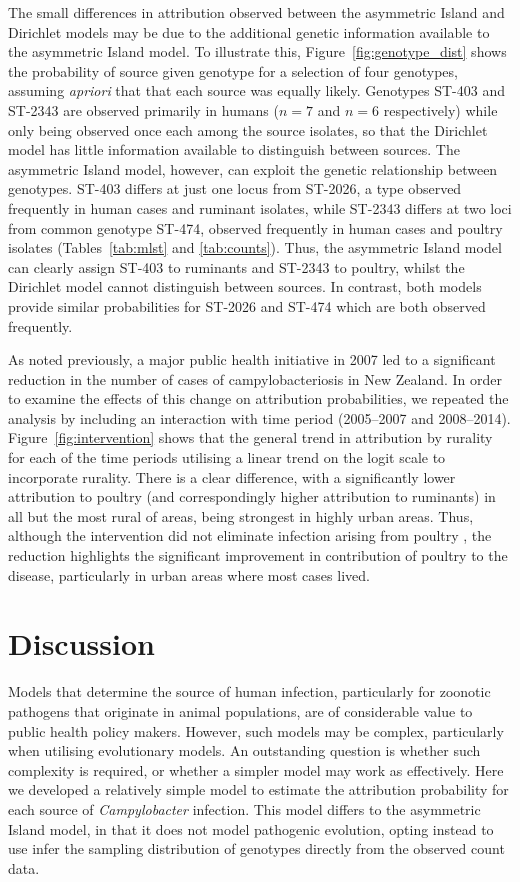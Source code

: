 \documentclass[AMA,STIX1COL]{WileyNJD-v2}
\begin{document}
The small differences in attribution observed between the asymmetric Island and Dirichlet models may be due to the additional genetic information available to the asymmetric Island model. To illustrate this, Figure~\ref{fig:genotype_dist} shows the probability of source given genotype for a selection of four genotypes, assuming \emph{apriori} that that each source was equally likely. Genotypes ST-403 and ST-2343 are observed primarily in humans ($n=7$ and $n=6$ respectively) while only being observed once each among the source isolates, so that the Dirichlet model has little information available to distinguish between sources. The asymmetric Island model, however, can exploit the genetic relationship between genotypes. ST-403 differs at just one locus from ST-2026, a type observed frequently in human cases and ruminant isolates, while ST-2343 differs at two loci from common genotype ST-474, observed frequently in human cases and poultry isolates (Tables~\ref{tab:mlst} and \ref{tab:counts}). Thus, the asymmetric Island model can clearly assign ST-403 to ruminants and ST-2343 to poultry, whilst the Dirichlet model cannot distinguish between sources. In contrast, both models provide similar probabilities for ST-2026 and ST-474 which are both observed frequently.

As noted previously, a major public health initiative in 2007 led to a significant reduction in the number of cases of campylobacteriosis in New Zealand. In order to examine the effects of this change on attribution probabilities, we repeated the analysis by including an interaction with time period (2005--2007 and 2008--2014). Figure~\ref{fig:intervention} shows that the general trend in attribution by rurality for each of the time periods utilising a linear trend on the logit scale to incorporate rurality. There is a clear difference, with a significantly lower attribution to poultry (and correspondingly higher attribution to ruminants) in all but the most rural of areas, being strongest in highly urban areas. Thus, although the intervention did not eliminate infection arising from poultry \cite{MuelM}, the reduction highlights the significant improvement in contribution of poultry to the disease, particularly in urban areas where most cases lived.

\section{Discussion}
Models that determine the source of human infection, particularly for zoonotic pathogens that originate in animal populations, are of considerable value to public health policy makers. However, such models may be complex, particularly when utilising evolutionary models. An outstanding question is whether such complexity is required, or whether a simpler model may work as effectively. Here we developed a relatively simple model to estimate the attribution probability for each source of \textit{Campylobacter} infection. This model differs to the asymmetric Island model, in that it does not model pathogenic evolution, opting instead to use infer the sampling distribution of genotypes directly from the observed count data.
\end{document}

